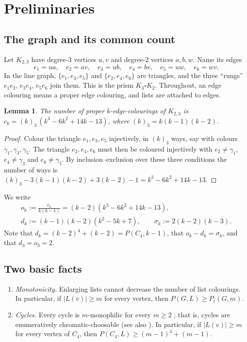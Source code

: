 \documentclass[11pt]{amsart}
\newtheorem{lemma}[theorem]{Lemma}
\theoremstyle{definition}
\theoremstyle{remark}
\newcommand{\Pl}{P_\ell}
\newcommand{\1}{\mathbf 1}
\begin{document}
\section{Preliminaries}\label{sec:prelim}

\subsection{The graph and its common count}
Let $K_{2,3}$ have degree-$3$ vertices $u,v$ and degree-$2$ vertices $a,b,w$. Name its edges
\[
e_1=ua,\quad e_2=av,\quad e_3=ub,\quad e_4=bv,\quad e_5=uw,\quad e_6=wv .
\]
In the line graph, $\{e_1,e_3,e_5\}$ and $\{e_2,e_4,e_6\}$ are triangles, and the three ``rungs''
$e_1e_2$, $e_3e_4$, $e_5e_6$ join them. This is the prism $K_3\square K_2$. Throughout, an edge
colouring means a proper edge colouring, and lists are attached to edges.

\begin{lemma}\label{lem:ck}
The number of proper $k$-edge-colourings of $K_{2,3}$ is $c_k=(k)_3\,(k^3-6k^2+14k-13)$, where
$(k)_3=k(k-1)(k-2)$.
\end{lemma}
\begin{proof}
Colour the triangle $e_1,e_3,e_5$ injectively, in $(k)_3$ ways, say with colours $\gamma_1,\gamma_3,\gamma_5$.
The triangle $e_2,e_4,e_6$ must then be coloured injectively with $e_2\ne\gamma_1$, $e_4\ne\gamma_3$ and
$e_6\ne\gamma_5$. By inclusion--exclusion over these three conditions the number of ways is
$(k)_3-3(k-1)(k-2)+3(k-2)-1=k^3-6k^2+14k-13$.
\end{proof}

We write
\begin{gather*}
o_k:=\frac{c_k}{k(k-1)}=(k-2)(k^3-6k^2+14k-13),\\
d_k:=(k-1)(k-2)(k^2-5k+7),\qquad \sigma_k:=2(k-2)(k-3).
\end{gather*}
Note that $d_k=(k-2)^4+(k-2)=P(C_4,k-1)$, that $o_k-d_k=\sigma_k$, and that $d_3=o_3=2$.

\subsection{Two basic facts}
\begin{enumerate}[label=(F\arabic*)]
\item\label{F:mono} \emph{Monotonicity.} Enlarging lists cannot decrease the number of list colourings.
In particular, if $|L(v)|\ge m$ for every vertex, then $P(G,L)\ge \Pl(G,m)$.
\item\label{F:cycle} \emph{Cycles.} Every cycle is $m$-monophilic for every $m\ge2$
\cite[Theorem~1]{KN}; that is, cycles are enumeratively chromatic-choosable (see also
\cite[Theorem~4(ii)]{AM}). In particular, if $|L(v)|\ge m$ for every vertex of $C_4$, then
$P(C_4,L)\ge (m-1)^4+(m-1)$.
\end{enumerate}
\end{document}
